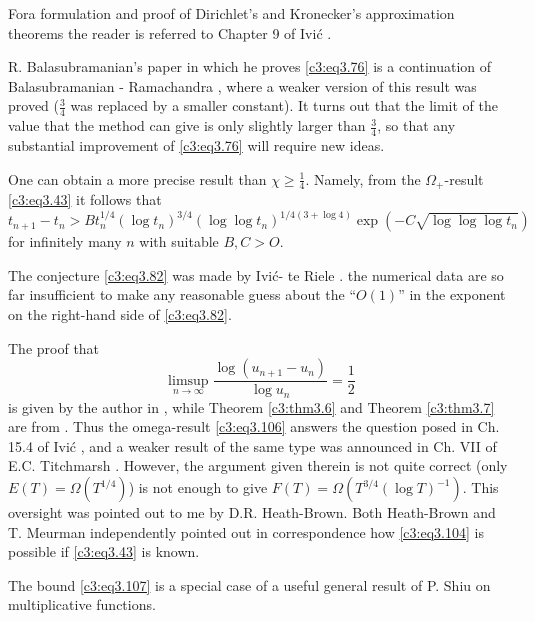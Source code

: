 For\pageoriginale a formulation and proof of Dirichlet's and
Kronecker's approximation theorems the reader is referred to Chapter 9
of Ivi\'c \cite{Ivic1}.

R. Balasubramanian's paper \cite{Balasubramanian2} in which he proves
\eqref{c3:eq3.76} is a continuation of Balasubramanian - Ramachandra
\cite{Balasubramanian and Ramachandra1}, where a weaker version of this result was proved
($\frac{3}{4}$ was replaced by a smaller constant). It turns out that
the limit of the value that  the method can give is only slightly
larger than $\frac{3}{4}$, so that any substantial improvement of
\eqref{c3:eq3.76} will require new ideas.

One can obtain a more precise result than $\chi \geq
\frac{1}{4}$. Namely, from the $\Omega_+$-result \eqref{c3:eq3.43} it
follows that
$$
t_{n+1}- t_{n} > B t^{1/4}_{n} (\log t_n)^{3/4} (\log \log
t_n)^{1/4(3+ \log 4)} \exp \left(-C\sqrt{\log \log \log t_n}\right)
$$  
for infinitely many $n$ with suitable $B, C > O$.

The conjecture \eqref{c3:eq3.82} was made by Ivi\'c- te Riele
\cite{Ivic1}. the numerical data are so far insufficient to make any
reasonable guess about the ``$O(1)$'' in the exponent on the
right-hand side of \eqref{c3:eq3.82}. 

The proof that
$$
\limsup_{n \to \infty} \frac{\log (u_{n+1} - u_n)}{\log u_n} = \frac{1}{2}
$$
is given by the author in \cite{Ivic4}, while Theorem \ref{c3:thm3.6} and
Theorem \ref{c3:thm3.7} are from \cite{Ivic2}. Thus the omega-result
\eqref{c3:eq3.106} answers the question posed in Ch. 15.4 of Ivi\'c
\cite{Ivic1}, and a weaker result of the same type was announced in
Ch. VII of E.C. Titchmarsh \cite{Titchmarsh1}. However, the argument given
therein is not quite correct (only $E(T) = \Omega (T^{1/4})$) is not
enough to give $F(T)= \Omega (T^{3/4}(\log T)^{-1})$. This oversight
was pointed out to me by D.R. Heath-Brown. Both Heath-Brown and
T. Meurman independently pointed out in correspondence how
\eqref{c3:eq3.104} is possible if \eqref{c3:eq3.43} is known. 

The bound \eqref{c3:eq3.107} is a special case of a useful general
result of P. Shiu \cite{Shiu1} on multiplicative functions.

